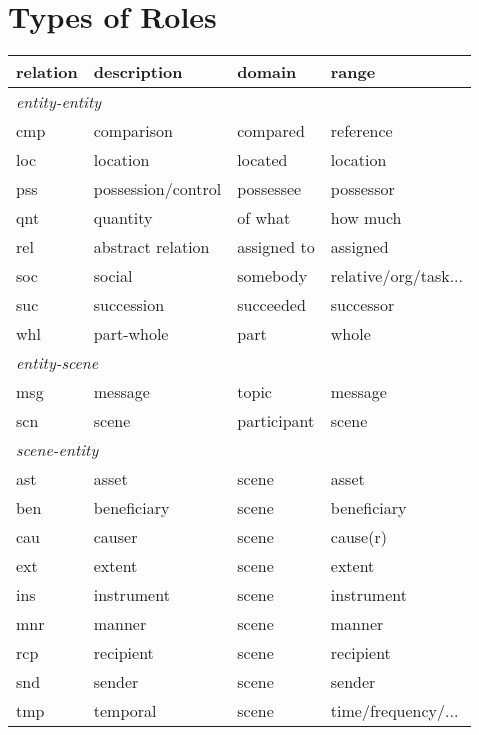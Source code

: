 \documentclass[a4paper]{article}
\begin{document}
\section{Types of Roles}

\begin{table}
    \begin{tabular}{llll}
        \toprule
        \textbf{relation} & \textbf{description} & \textbf{domain} & \textbf{range} \\
        \midrule
        \multicolumn{4}{l}{\emph{entity-entity}} \\
        cmp & comparison & compared & reference \\
        loc & location & located & location \\
        pss & possession/control & possessee & possessor \\
        qnt & quantity & of what & how much \\
        rel & abstract relation & assigned to & assigned \\
        soc & social & somebody & relative/org/task... \\
        suc & succession & succeeded & successor \\
        whl & part-whole & part & whole \\
        \midrule
        \multicolumn{4}{l}{\emph{entity-scene}} \\
        msg & message & topic & message \\
        scn & scene & participant & scene \\
        \midrule
        \multicolumn{4}{l}{\emph{scene-entity}} \\
        ast & asset & scene & asset \\
        ben & beneficiary & scene & beneficiary \\
        cau & causer & scene & cause(r) \\
        ext & extent & scene & extent \\
        ins & instrument & scene & instrument \\
        mnr & manner & scene & manner \\
        rcp & recipient & scene & recipient \\
        snd & sender & scene & sender \\
        tmp & temporal & scene & time/frequency/... \\
        \midrule

\end{tabular}
\end{table}
\end{document}
